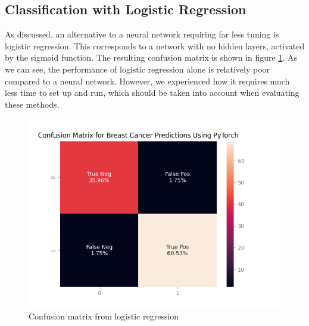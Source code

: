 \subsection{Classification with Logistic Regression}
As discussed, an alternative to a neural network requiring far less tuning is logistic regression. This corresponds to a network with no hidden layers, activated by the sigmoid function. The resulting confusion matrix is shown in figure \ref{fig:logreg}. As we can see, the performance of logistic regression alone is relatively poor compared to a neural network. However, we experienced how it requires much less time to set up and run, which should be taken into account when evaluating these methods.
\begin{figure}
    \centering
    \includegraphics[width=\linewidth]{figures/plots/logreg.png}
    \caption{Confusion matrix from logistic regression}
    \label{fig:logreg}
\end{figure}




